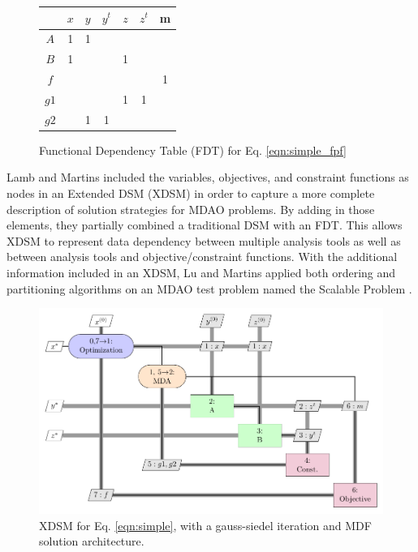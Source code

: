         \begin{figure}
            \begin{center}
            \begin{tabular}{|c|c|c|c|c|c|c|}
                \hline
                     & $x$ & $y$ & $y^t$ & $z$ & $z^t$ & m \\ \hline
                $A$  & 1  & 1    &       &     &       &   \\ \hline
                $B$  & 1  &      &       & 1   &       &   \\ \hline
                $f$  &    &      &       &     &       & 1 \\ \hline
                $g1$ &    &      &       & 1   & 1     &   \\ \hline
                $g2$ &    & 1    & 1     &     &       &   \\
                \hline
            \end{tabular}
            \caption{Functional Dependency Table (FDT) for Eq. \ref{eqn:simple_fpf} \label{fig:FDT_simple}}
            \end{center}
        \end{figure}

        Lamb and Martins included the variables, objectives, and constraint functions as nodes in an Extended 
        DSM (XDSM) in order to capture a more complete description of solution strategies for MDAO problems\cite{Lambe2012}. By adding in those 
        elements, they partially combined a traditional DSM with an FDT. 
        This allows XDSM to represent data dependency between multiple analysis tools as well as between analysis tools and
        objective/constraint functions. With the additional information included in an XDSM, Lu and Martins applied both ordering and partitioning 
        algorithms on an MDAO test problem named the Scalable Problem \cite{Lu2012}. 

        \begin{figure}
            \begin{center}
            \includegraphics[height=.25\textheight]{XDSM/simple}
            \caption{XDSM for Eq. \ref{eqn:simple}, with a gauss-siedel iteration and MDF solution architecture. \label{fig:XDSM_simple}}
            \end{center}
        \end{figure}

